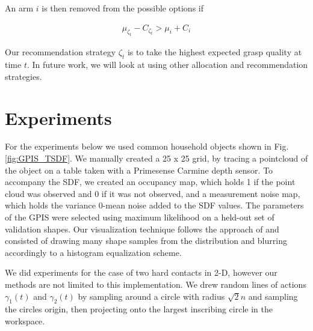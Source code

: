 \documentclass[letterpaper, 10 pt, conference]{ieeeconf}  %
\begin{document}



An arm $i$ is then removed from the possible options if 

\vspace{-2ex}
\begin{align*}
\mu_{\zeta_t} - C_{\zeta_t} >   \mu_{i}+C_{i}
\end{align*}

Our recommendation strategy $\zeta_t$ is to take the highest expected grasp quality at time $t$. In future work, we will look at using other allocation and recommendation strategies. 

\section{Experiments}
For the experiments below we used common household objects shown in Fig. \ref{fig:GPIS_TSDF}. We manually created a 25 x 25 grid, by tracing a pointcloud of the object on a table taken with a Primesense Carmine depth sensor. To accompany the SDF, we created an occupancy map, which holds 1 if the point cloud was observed and 0 if it was not observed, and a measurement noise map, which holds the variance 0-mean noise added to the SDF values. The parameters of the GPIS were selected using maximum likelihood on a held-out set of validation shapes. Our visualization technique follows the approach of \cite{jeffs} and consisted of drawing many shape samples from the distribution and blurring accordingly to a histogram equalization scheme. 

We did experiments for the case of two hard contacts in 2-D, however our methods are not limited to this implementation. We drew random lines of actions $\gamma_1(t)$ and $\gamma_2(t)$ by sampling around a circle with radius $\sqrt{2}n$ and sampling the circles origin, then projecting onto the largest inscribing circle in the workspace. 
\end{document}
